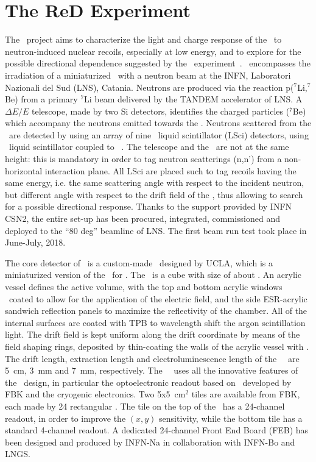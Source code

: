 \section{The R\lowercase{e}D Experiment}
\label{sec:Red}

The \ReD\ project aims to characterize the light and charge response of the \LArTPC\ to neutron-induced nuclear recoils, especially at low energy, and to explore for the possible directional dependence suggested by the \SCENE\  experiment~\cite{Alexander:2013ke,Cao:2015ks}. \ReD\ encompasses the irradiation of a miniaturized \LArTPC\ with a neutron beam at the INFN, Laboratori Nazionali del Sud (LNS), Catania. Neutrons are produced via the reaction p($^{7}$Li,$^7$Be) from a primary $^{7}$Li beam delivered by the TANDEM accelerator of LNS.  A $\Delta E/E$ telescope, made by two Si detectors, identifies the charged particles ($^{7}$Be) which accompany the neutrons emitted towards the \TPC. Neutrons scattered from the \TPC\ are detected by using an array of nine \RedLNSNeutronSpectrometerDetectorsPMTsDiameter\ liquid scintillator (LSci) detectors,  using \RedLNSNeutronSpectrometerDetectorsScintillatorType\ liquid scintillator coupled to \RedLNSNeutronSpectrometerDetectorsPMTsType\ \PMTs.  The  telescope and the \TPC\ are not at the same height: this is mandatory in order to tag neutron scatterings (n,n') from a non-horizontal interaction plane. All LSci are placed such to tag recoils having the same energy, i.e. the same scattering angle with respect to the incident neutron, but different angle with respect to the drift field of the \LArTPC, thus allowing to search for a possible directional response. Thanks to the support provided by INFN CSN2, the entire set-up has been procured, integrated, commissioned and deployed to the ``80 deg'' beamline of LNS. The first beam run test took place in June-July, 2018. 

The core detector of \ReD\ is a custom-made \TPC\ designed by UCLA, which is a miniaturized version of the \LArTPC\ for \DSks.  The \TPC\ is a cube with size of about \GAPTPCActiveDiameter.  An acrylic vessel defines the active volume, with the top and bottom acrylic windows \ITO\ coated to allow for the application of the electric field, and the side ESR-acrylic sandwich reflection panels to maximize the reflectivity of the chamber. All of the internal surfaces are coated with TPB to wavelength shift the argon scintillation light. The drift field is kept uniform along the drift coordinate by means of the field shaping rings, deposited by thin-coating the walls of the acrylic vessel with \ITO. The drift length, extraction length and electroluminescence length of the \ReD\ \TPC\ are 5~cm, 3~mm and 7~mm, respectively. The \ReD\ \TPC\ uses all the innovative features of the \DSks\ design, in particular the optoelectronic readout based on \SiPM\ developed by FBK and the cryogenic electronics. Two 5x5~cm$^2$ tiles are available from FBK, each made by 24 rectangular \SiPMs.  The tile on the top of the \LArTPC\ has a 24-channel readout, in order to improve the $(x,y)$ sensitivity, while the bottom tile has a standard 4-channel readout.  A dedicated 24-channel Front End Board (FEB) has been designed and produced by INFN-Na in collaboration with INFN-Bo and LNGS. 

